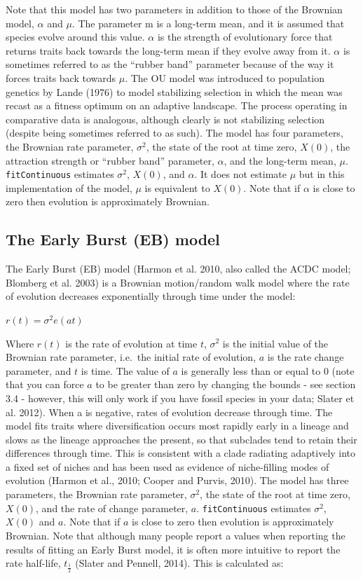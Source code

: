 \documentclass[]{book}
\begin{document}
Note that this model has two parameters in addition to those of the
Brownian model, \(\alpha\) and \(\mu\). The parameter m is a long-term
mean, and it is assumed that species evolve around this value.
\(\alpha\) is the strength of evolutionary force that returns traits
back towards the long-term mean if they evolve away from it. \(\alpha\)
is sometimes referred to as the ``rubber band'' parameter because of the
way it forces traits back towards \(\mu\). The OU model was introduced
to population genetics by Lande (1976) to model stabilizing selection in
which the mean was recast as a fitness optimum on an adaptive landscape.
The process operating in comparative data is analogous, although clearly
is not stabilizing selection (despite being sometimes referred to as
such). The model has four parameters, the Brownian rate parameter,
\(\sigma^2\), the state of the root at time zero, \(X(0)\), the
attraction strength or ``rubber band'' parameter, \(\alpha\), and the
long-term mean, \(\mu\). \texttt{fitContinuous} estimates \(\sigma^2\),
\(X(0)\), and \(\alpha\). It does not estimate \(\mu\) but in this
implementation of the model, \(\mu\) is equivalent to \(X(0)\). Note
that if \(\alpha\) is close to zero then evolution is approximately
Brownian.

\subsection{The Early Burst (EB) model}\label{the-early-burst-eb-model}

The Early Burst (EB) model (Harmon et al. 2010, also called the ACDC
model; Blomberg et al. 2003) is a Brownian motion/random walk model
where the rate of evolution decreases exponentially through time under
the model:

\(r(t) = \sigma^2e(at)\)

Where \(r(t)\) is the rate of evolution at time \(t\), \(\sigma^2\) is
the initial value of the Brownian rate parameter, i.e.~the initial rate
of evolution, \(a\) is the rate change parameter, and \(t\) is time. The
value of \(a\) is generally less than or equal to 0 (note that you can
force \(a\) to be greater than zero by changing the bounds - see section
3.4 - however, this will only work if you have fossil species in your
data; Slater et al. 2012). When a is negative, rates of evolution
decrease through time. The model fits traits where diversification
occurs most rapidly early in a lineage and slows as the lineage
approaches the present, so that subclades tend to retain their
differences through time. This is consistent with a clade radiating
adaptively into a fixed set of niches and has been used as evidence of
niche-filling modes of evolution (Harmon et al., 2010; Cooper and
Purvis, 2010). The model has three parameters, the Brownian rate
parameter, \(\sigma^2\), the state of the root at time zero, \(X(0)\),
and the rate of change parameter, \(a\). \texttt{fitContinuous}
estimates \(\sigma^2\), \(X(0)\) and \(a\). Note that if \(a\) is close
to zero then evolution is approximately Brownian. Note that although
many people report a values when reporting the results of fitting an
Early Burst model, it is often more intuitive to report the rate
half-life, \(t_{\frac{1}{2}}\) (Slater and Pennell, 2014). This is
calculated as:
\end{document}
